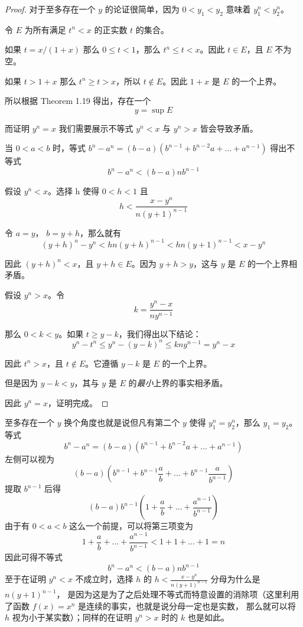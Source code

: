 \documentclass[../poma-notes.tex]{subfiles}
\begin{document}
\begin{proof}
  对于至多存在一个 $y$ 的论证很简单，因为 $0 < y_1 < y_2$ 意味着 $y^n_1 < y^n_2$。

  令 $E$ 为所有满足 $t^n < x$ 的正实数 $t$ 的集合。

  如果 $t = x/(1+x)$ 那么 $0 \le t < 1$，那么 $t^n \le t < x$。因此 $t \in E$，且 $E$ 不为空。

  如果 $t>1+x$ 那么 $t^n \ge t > x$，所以 $t \notin E$。因此 $1+x$ 是 $E$ 的一个上界。

  所以根据 Theorem 1.19 得出，存在一个
  \[ y = \sup E\]

  而证明 $y^n = x$ 我们需要展示不等式 $y^n < x$ 与 $y^n > x$ 皆会导致矛盾。

  当  $0<a<b$ 时，等式 $b^n - a^n = (b-a)(b^{n-1} + b^{n-2}a + \dots + a^{n-1})$ 得出不等式
  \[b^n - a^n < (b-a)nb^{n-1}\]

  假设 $y^n<x$。选择 h 使得 $0<h<1$ 且
  \[h < \frac{x-y^n}{n(y+1)^{n-1}}\]

  令 $a=y$， $b=y+h$，那么就有
  \[(y+h)^n-y^n < hn(y+h)^{n-1} < hn(y+1)^{n-1} < x-y^n\]

  因此 $(y+h)^n < x$，且 $y+h \in E$。因为 $y+h>y$，这与 $y$ 是 $E$ 的一个上界相矛盾。

  假设 $y^n>x$。令
  \[k=\frac{y^n-x}{ny^{n-1}}\]

  那么 $0<k<y$。如果 $t \ge y-k$，我们得出以下结论：
  \[y^n - t^n \le y^n - (y - k)^n \le kny^{n-1} = y^n - x\]

  因此 $t^n > x$，且 $t \notin E$。它遵循 $y - k$ 是 $E$ 的一个上界。

  但是因为 $y-k<y$，其与 $y$ 是 $E$ 的\textit{最小}上界的事实相矛盾。

  因此 $y^n=x$，证明完成。
\end{proof}

\begin{anote}
  至多存在一个 $y$ 换个角度也就是说但凡有第二个 $y$ 使得 $y^n_1 = y^n_2$，那么 $y_1 = y_2$。\\
  等式
  \[b^n - a^n = (b-a)(b^{n-1} + b^{n-2}a + \dots + a^{n-1})\]
  左侧可以视为
  \[(b-a)(b^{n-1} + b^{n-1}\frac{a}{b} + \dots + b^{n-1}\frac{a}{b^{n-1}})\]
  提取 $b^{n-1}$ 后得
  \[(b-a)b^{n-1}(1 + \frac{a}{b} + \dots + \frac{a^{n-1}}{b^{n-1}})\]
  由于有 $0<a<b$ 这么一个前提，可以将第三项变为
  \[1 + \frac{a}{b} + \dots + \frac{a^{n-1}}{b^{n-1}} < 1 + 1 + \dots + 1 = n\]
  因此可得不等式
  \[b^n - a^n < (b-a)nb^{n-1}\]
  至于在证明 $y^n < x$ 不成立时，选择 $h$ 的 $h<\frac{x-y^n}{n(y+1)^{n-1}}$ 分母为什么是 $n(y+1)^{n-1}$，
  是因为这是为了之后处理不等式而特意设置的消除项（这里利用了函数 $f(x)=x^n$ 是连续的事实，也就是说分母一定也是实数，
  那么就可以将 $h$ 视为小于某实数）；同样的在证明 $y^n > x$ 时的 $k$ 也是如此。
\end{anote}
\end{document}
